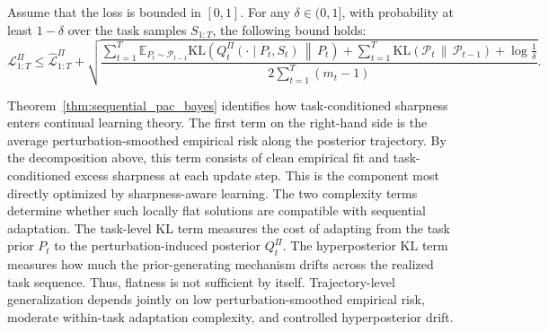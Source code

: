 \documentclass{article}
\begin{document}


\begin{theorem}
\label{thm:sequential_pac_bayes}
Assume that the loss is bounded in $[0,1]$.
For any $\delta\in(0,1]$, with probability at least $1-\delta$ over the task samples $S_{1:T}$, the following bound holds:
$$
\mathcal L_{1:T}^\Pi
\le
\widehat{\mathcal L}_{1:T}^\Pi
+
\sqrt{
\frac{
\sum_{t=1}^{T}
\mathbb E_{P_t\sim \mathcal P_{t-1}}
\mathrm{KL}\!\left(
Q_t^\Pi(\cdot \mid P_t,S_t)
\,\middle\|\,
P_t
\right)
+
\sum_{t=1}^{T}
\mathrm{KL}\!\left(
\mathcal P_t
\,\middle\|\,
\mathcal P_{t-1}
\right)
+
\log \frac{1}{\delta}
}{
2\sum_{t=1}^{T}(m_t-1)
}
}.
$$
\end{theorem}


Theorem~\ref{thm:sequential_pac_bayes} identifies how task-conditioned sharpness enters continual learning theory.
The first term on the right-hand side is the average perturbation-smoothed empirical risk along the posterior trajectory.
By the decomposition above, this term consists of clean empirical fit and task-conditioned excess sharpness at each update step.
This is the component most directly optimized by sharpness-aware learning.
The two complexity terms determine whether such locally flat solutions are compatible with sequential adaptation.
The task-level KL term measures the cost of adapting from the task prior $P_t$ to the perturbation-induced posterior $Q_t^\Pi$.
The hyperposterior KL term measures how much the prior-generating mechanism drifts across the realized task sequence.
Thus, flatness is not sufficient by itself.
Trajectory-level generalization depends jointly on low perturbation-smoothed empirical risk, moderate within-task adaptation complexity, and controlled hyperposterior drift.
\end{document}
